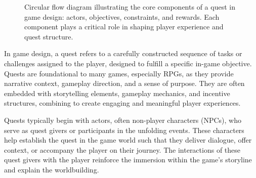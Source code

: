 \begin{figure}[t]
  \centering
  \caption{Circular flow diagram illustrating the core components of a quest in game design: actors, objectives, constraints, and rewards. Each component plays a critical role in shaping player experience and quest structure.}
  \label{fig:quest-components}
\end{figure}

In game design, a quest refers to a carefully constructed sequence of tasks or challenges
assigned to the player, designed to fulfill a specific in-game objective. Quests are foundational
to many games, especially RPGs, as they provide narrative context, gameplay
direction, and a sense of purpose. They are often embedded with storytelling elements,
gameplay mechanics, and incentive structures, combining to create engaging and meaningful
player experiences.

Quests typically begin with actors, often non-player characters (NPCs), who serve
as quest givers or participants in the unfolding events. These characters help establish the
quest in the game world such that they deliver dialogue, offer context, or accompany
the player on their journey. The interactions of these quest givers with the player reinforce
the immersion within the game's storyline and explain the worldbuilding.

